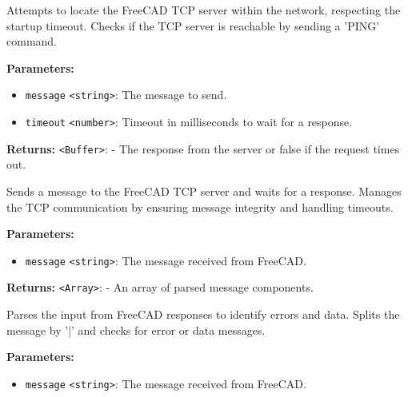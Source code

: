 \documentclass[12pt,a4paper]{article}
\begin{document}
\noindent Attempts to locate the FreeCAD TCP server within the network, respecting the startup timeout.
Checks if the TCP server is reachable by sending a 'PING' command.

\vspace{5mm}
\noindent {}


\noindent \textbf{Parameters:}
\begin{itemize}
  \item \texttt{message} \texttt{<string>}: The message to send.
  \item \texttt{timeout} \texttt{<number>}: Timeout in milliseconds to wait for a response.
\end{itemize}

\noindent \textbf{Returns:} \texttt{<Buffer>}: - The response from the server or false if the request times out.

\noindent Sends a message to the FreeCAD TCP server and waits for a response.
Manages the TCP communication by ensuring message integrity and handling timeouts.

\vspace{5mm}
\noindent {}


\noindent \textbf{Parameters:}
\begin{itemize}
  \item \texttt{message} \texttt{<string>}: The message received from FreeCAD.
\end{itemize}

\noindent \textbf{Returns:} \texttt{<Array>}: - An array of parsed message components.

\noindent Parses the input from FreeCAD responses to identify errors and data.
Splits the message by '|' and checks for error or data messages.

\vspace{5mm}
\noindent {}


\noindent \textbf{Parameters:}
\begin{itemize}
  \item \texttt{message} \texttt{<string>}: The message received from FreeCAD.
\end{itemize}
\end{document}
